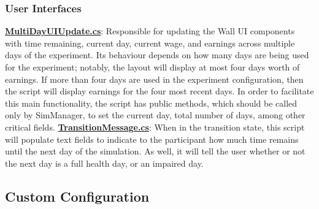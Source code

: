 \documentclass{article}
\begin{document}
\subsubsection*{User Interfaces}
\href{https://bit.ly/2G9SRs1}{\textbf{MultiDayUIUpdate.cs}}: Responsible for updating the Wall UI components with time remaining, current day, current wage, and earnings across multiple days of the experiment. Its behaviour depends on how many days are being used for the experiment; notably, the layout will display at most four days worth of earnings. If more than four days are used in the experiment configuration, then the script will display earnings for the four most recent days. In order to facilitate this main functionality, the script has public methods, which should be called only by SimManager, to set the current day, total number of days, among other critical fields. \newline \newline
\href{https://bit.ly/2VHtW5B}{\textbf{TransitionMessage.cs}}: When in the transition state, this script will populate text fields to indicate to the participant how much time remains until the next day of the simulation. As well, it will tell the user whether or not the next day is a full health day, or an impaired day. \newline \newline


\subsection*{Custom Configuration} %
\end{document}

